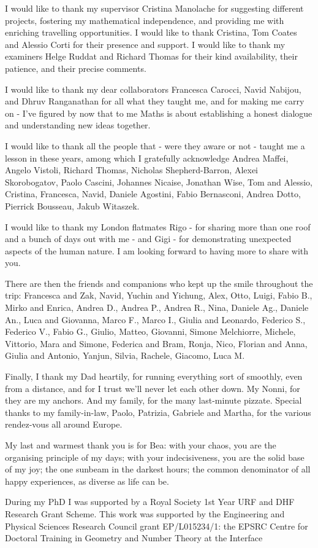 \documentclass[a4paper,11pt,twoside,final]{book}
\theoremstyle{definition}
\theoremstyle{definition}
\numberwithin{equation}{chapter}    %
\numberwithin{section}{chapter} %
\begin{document}
{\thispagestyle{empty}

\null
\vfill


\medskip

\noindent I would like to thank my supervisor Cristina Manolache for suggesting different projects, fostering my mathematical independence, and providing me with enriching travelling opportunities. I would like to thank Cristina, Tom Coates and Alessio Corti for their presence and support. I would like to thank my examiners Helge Ruddat and Richard Thomas for their kind availability, their patience, and their precise comments.

I would like to thank my dear collaborators Francesca Carocci, Navid Nabijou, and Dhruv Ranganathan for all what they taught me, and for making me carry on - I've figured by now that to me Maths is about establishing a honest dialogue and understanding new ideas together.

I would like to thank all the people that - were they aware or not - taught me a lesson in these years, among which I gratefully acknowledge Andrea Maffei, Angelo Vistoli, Richard Thomas, Nicholas Shepherd-Barron, Alexei Skorobogatov, Paolo Cascini, Johannes Nicaise, Jonathan Wise, Tom and Alessio, Cristina, Francesca, Navid, Daniele Agostini, Fabio Bernasconi, Andrea Dotto, Pierrick Bousseau, Jakub Witaszek.

I would like to thank my London flatmates Rigo - for sharing more than one roof and a bunch of days out with me - and Gigi - for demonstrating unexpected aspects of the human nature. I am looking forward to having more to share with you.

There are then the friends and companions who kept up the smile throughout the trip: Francesca and Zak, Navid, Yuchin and Yichung, Alex, Otto, Luigi, Fabio B., Mirko and Enrica, Andrea D., Andrea P., Andrea R., Nina, Daniele Ag., Daniele An., Luca and Giovanna, Marco F., Marco I., Giulia and Leonardo, Federico S., Federico V., Fabio G., Giulio, Matteo, Giovanni, Simone Melchiorre, Michele, Vittorio, Mara and Simone, Federica and Bram, Ronja, Nico, Florian and Anna, Giulia and Antonio, Yanjun, Silvia, Rachele, Giacomo, Luca M.

Finally, I thank my Dad heartily, for running everything sort of smoothly, even from a distance, and for I trust we'll never let each other down. My Nonni, for they are my anchors. And my family, for the many last-minute pizzate. Special thanks to my family-in-law, Paolo, Patrizia, Gabriele and Martha, for the various rendez-vous all around Europe.

My last and warmest thank you is for Bea: with your chaos, you are the organising principle of my days; with your indecisiveness, you are the solid base of my joy; the one sunbeam in the darkest hours; the common denominator of all happy experiences, as diverse as life can be.

During my PhD I was supported by a Royal Society 1st Year URF and DHF Research Grant Scheme.
This work was supported by the Engineering and Physical Sciences Research Council grant EP/L015234/1: the EPSRC Centre for Doctoral Training in Geometry and Number Theory at the Interface
}
\end{document}
